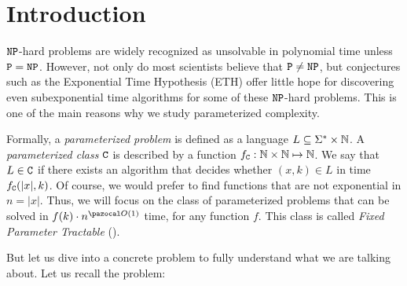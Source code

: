 \section{Introduction}
\label{section:introduction}

$\texttt{NP}$-hard problems are widely recognized as unsolvable in polynomial time unless $\texttt{P} = \texttt{NP}$. However, not only do most scientists believe that $\texttt{P} \neq \texttt{NP}$, but conjectures such as the Exponential Time Hypothesis (ETH) \cite{impagliazzo2001complexity} offer little hope for discovering even subexponential time algorithms for some of these $\texttt{NP}$-hard problems. This is one of the main reasons why we study parameterized complexity.

Formally, a \textit{parameterized problem} is defined as a language $L \subseteq \Sigma^* \times \mathbb{N}$.
A \textit{parameterized class} $\texttt{C}$ is described by a function $f_{\texttt{C}} : \mathbb{N} \times \mathbb{N} \mapsto \mathbb{N}$. We say that $L \in \texttt{C}$ if there exists an algorithm that decides whether $(x, k) \in L$ in time $f_{\texttt{C}}(|x|, k)$. Of course, we would prefer to find functions that are not exponential in $n = |x|$. Thus, we will focus on the class of parameterized problems that can be solved in $f(k)\cdot n^{\O(1)}$ time, for any function $f$. This class is called \textit{Fixed Parameter Tractable} ().

\medskip

But let us dive into a concrete problem to fully understand what we are talking about. Let us recall the  problem:

\begin{problem}
\end{problem}

